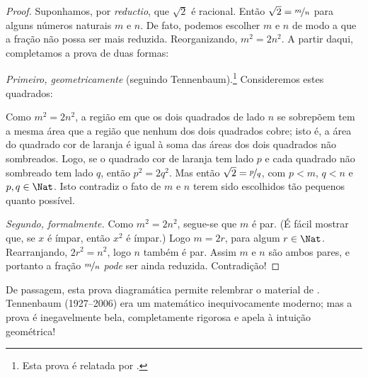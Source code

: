 \documentclass[../../../include/open-logic-section]{subfiles}
\begin{document}
\begin{proof}
Suponhamos, por \emph{reductio}, que $\sqrt{2}$ é racional. Então $\sqrt{2} =
\nicefrac{m}{n}$ para alguns números naturais $m$ e $n$. De fato, podemos
escolher $m$ e $n$ de modo a que a fração não possa ser mais reduzida.
Reorganizando, $m^{2} = 2n^{2}$. A partir daqui, completamos a prova de duas
formas:

\emph{Primeiro, geometricamente} (seguindo Tennenbaum).\footnote{Esta prova é
relatada por \cite{Conway2006}.} Consideremos estes quadrados:
\begin{center}	
\end{center}
Como $m^2 = 2n^2$, a região em que os dois quadrados de lado $n$ se sobrepõem
tem a mesma área que a região que nenhum dos dois quadrados cobre; isto é, a área
do quadrado cor de laranja é igual à soma das áreas dos dois quadrados não
sombreados. Logo, se o quadrado cor de laranja tem lado $p$ e cada quadrado não
sombreado tem lado $q$, então $p^2 = 2q^2$. Mas então $\sqrt{2} = \nicefrac{p}{q}$,
com $p < m$, $q < n$ e $p, q \in \Nat$. Isto contradiz o fato de $m$ e $n$
terem sido escolhidos tão pequenos quanto possível.
		
\emph{Segundo, formalmente.} Como $m^{2} = 2n^{2}$, segue-se que $m$ é par. (É
fácil mostrar que, se $x$ é ímpar, então $x^2$ é ímpar.) Logo $m = 2r$, para
algum $r \in \Nat$. Rearranjando, $2r^2 = n^{2}$, 
logo $n$ também é par. Assim $m$ e $n$ são ambos pares, e portanto a fração
$\nicefrac{m}{n}$ \emph{pode} ser ainda reduzida. Contradição!
\end{proof}

De passagem, esta prova diagramática permite relembrar o material de
. Tennenbaum (1927--2006) era um matemático
inequivocamente moderno; mas a prova é inegavelmente bela, completamente rigorosa
e apela à intuição geométrica!
\end{document}
